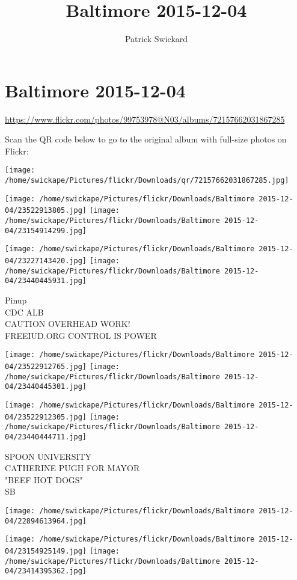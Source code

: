 \documentclass[10pt,letterpaper]{article}
\title{Baltimore 2015-12-04}
\author{Patrick Swickard}
\date{}
\begin{document}
\section*{Baltimore 2015-12-04}

\url{https://www.flickr.com/photos/99753978@N03/albums/72157662031867285}

Scan the QR code below to go to the original album with full-size photos on Flickr:

\texttt{[image: /home/swickape/Pictures/flickr/Downloads/qr/72157662031867285.jpg]}
\pagebreak

\texttt{[image: /home/swickape/Pictures/flickr/Downloads/Baltimore 2015-12-04/23522913805.jpg]}
\texttt{[image: /home/swickape/Pictures/flickr/Downloads/Baltimore 2015-12-04/23154914299.jpg]}

\texttt{[image: /home/swickape/Pictures/flickr/Downloads/Baltimore 2015-12-04/23227143420.jpg]}
\texttt{[image: /home/swickape/Pictures/flickr/Downloads/Baltimore 2015-12-04/23440445931.jpg]}

Pinup\\
CDC ALB\\
CAUTION OVERHEAD WORK!\\
FREEIUD.ORG CONTROL IS POWER
\pagebreak

\texttt{[image: /home/swickape/Pictures/flickr/Downloads/Baltimore 2015-12-04/23522912765.jpg]}
\texttt{[image: /home/swickape/Pictures/flickr/Downloads/Baltimore 2015-12-04/23440445301.jpg]}

\texttt{[image: /home/swickape/Pictures/flickr/Downloads/Baltimore 2015-12-04/23522912305.jpg]}
\texttt{[image: /home/swickape/Pictures/flickr/Downloads/Baltimore 2015-12-04/23440444711.jpg]}

SPOON UNIVERSITY\\
CATHERINE PUGH FOR MAYOR\\
"BEEF HOT DOGS"\\
SB
\pagebreak

\texttt{[image: /home/swickape/Pictures/flickr/Downloads/Baltimore 2015-12-04/22894613964.jpg]}

\vspace{0.25in}
\texttt{[image: /home/swickape/Pictures/flickr/Downloads/Baltimore 2015-12-04/23154925149.jpg]}
\texttt{[image: /home/swickape/Pictures/flickr/Downloads/Baltimore 2015-12-04/23414395362.jpg]}
\end{document}
